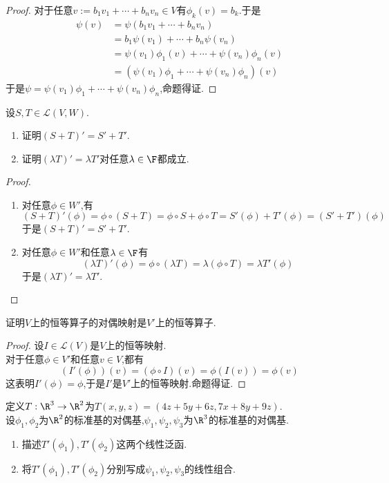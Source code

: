 \documentclass{ctexart}
\begin{document}
\begin{proof}
    对于任意$v:=b_1v_1+\cdots+b_nv_n\in V$有$\phi_k(v)=b_k$.于是
    $$\begin{aligned}
        \psi(v)
        &= \psi(b_1v_1+\cdots+b_nv_n) \\
        &= b_1\psi(v_1)+\cdots+b_n\psi(v_n) \\
        &= \psi(v_1)\phi_1(v)+\cdots+\psi(v_n)\phi_n(v) \\
        &= (\psi(v_1)\phi_1+\cdots+\psi(v_n)\phi_n)(v)
    \end{aligned}$$
    于是$\psi=\psi(v_1)\phi_1+\cdots+\psi(v_n)\phi_n$,命题得证.
\end{proof}
\begin{problem}[12.]
    设$S,T\in\mathcal{L}(V,W)$.
    \begin{enumerate}[label=\tbf{(\arabic*)}]
        \item 证明$(S+T)'=S'+T'$.
        \item 证明$(\lambda T)'=\lambda T'$对任意$\lambda\in\F$都成立.
    \end{enumerate}
\end{problem}
\begin{proof}
    \begin{enumerate}[label=\tbf{(\arabic*)}]
        \item 对任意$\phi\in W'$,有
            $$(S+T)'(\phi)=\phi\circ(S+T)=\phi\circ S+\phi\circ T=S'(\phi)+T'(\phi)=(S'+T')(\phi)$$
            于是$(S+T)'=S'+T'$.
        \item 对任意$\phi\in W'$和任意$\lambda\in\F$有
            $$(\lambda T)'(\phi)=\phi\circ(\lambda T)=\lambda(\phi\circ T)=\lambda T'(\phi)$$
            于是$(\lambda T)'=\lambda T'$.
    \end{enumerate}
\end{proof}
\begin{problem}[13.]
    证明$V$上的恒等算子的对偶映射是$V'$上的恒等算子.
\end{problem}
\begin{proof}
    设$I\in\mathcal{L}(V)$是$V$上的恒等映射.\\
    对于任意$\phi\in V'$和任意$v\in V$,都有
    $$(I'(\phi))(v)=(\phi\circ I)(v)=\phi(I(v))=\phi(v)$$
    这表明$I'(\phi)=\phi$,于是$I'$是$V'$上的恒等映射.命题得证.
\end{proof}
\begin{problem}[14.]
    定义$T:\R^3\to\R^2$为$T(x,y,z)=(4z+5y+6z,7x+8y+9z)$.\\
    设$\phi_1,\phi_2$为$\R^2$的标准基的对偶基,$\psi_1,\psi_2,\psi_3$为$\R^3$的标准基的对偶基.
    \begin{enumerate}[label=\tbf{(\arabic*)}]
        \item 描述$T'(\phi_1),T'(\phi_2)$这两个线性泛函.
        \item 将$T'(\phi_1),T'(\phi_2)$分别写成$\psi_1,\psi_2,\psi_3$的线性组合.
    \end{enumerate}
\end{problem}
\end{document}
